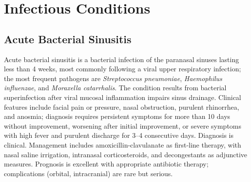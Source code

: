 \section{Infectious Conditions}








\label{sec:Infectious Conditions}

\subsection{Acute Bacterial Sinusitis}
\label{sec:Acute Bacterial Sinusitis}
Acute bacterial sinusitis is a bacterial infection of the paranasal sinuses lasting less than 4 weeks, most commonly following a viral upper respiratory infection; the most frequent pathogens are \textit{Streptococcus pneumoniae}, \textit{Haemophilus influenzae}, and \textit{Moraxella catarrhalis}. The condition results from bacterial superinfection after viral mucosal inflammation impairs sinus drainage. Clinical features include facial pain or pressure, nasal obstruction, purulent rhinorrhea, and anosmia; diagnosis requires persistent symptoms for more than 10 days without improvement, worsening after initial improvement, or severe symptoms with high fever and purulent discharge for 3--4 consecutive days. Diagnosis is clinical. Management includes amoxicillin-clavulanate as first-line therapy, with nasal saline irrigation, intranasal corticosteroids, and decongestants as adjunctive measures. Prognosis is excellent with appropriate antibiotic therapy; complications (orbital, intracranial) are rare but serious.

